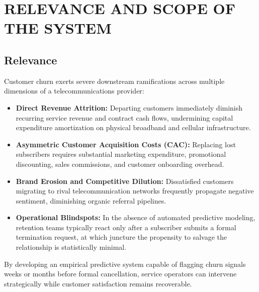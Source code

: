 \section{RELEVANCE AND SCOPE OF THE SYSTEM}

\subsection{Relevance}
Customer churn exerts severe downstream ramifications across multiple dimensions of a telecommunications provider:
\begin{itemize}
    \item \textbf{Direct Revenue Attrition:} Departing customers immediately diminish recurring service revenue and contract cash flows, undermining capital expenditure amortization on physical broadband and cellular infrastructure.
    \item \textbf{Asymmetric Customer Acquisition Costs (CAC):} Replacing lost subscribers requires substantial marketing expenditure, promotional discounting, sales commissions, and customer onboarding overhead.
    \item \textbf{Brand Erosion and Competitive Dilution:} Dissatisfied customers migrating to rival telecommunication networks frequently propagate negative sentiment, diminishing organic referral pipelines.
    \item \textbf{Operational Blindspots:} In the absence of automated predictive modeling, retention teams typically react only after a subscriber submits a formal termination request, at which juncture the propensity to salvage the relationship is statistically minimal.
\end{itemize}

By developing an empirical predictive system capable of flagging churn signals weeks or months before formal cancellation, service operators can intervene strategically while customer satisfaction remains recoverable.

